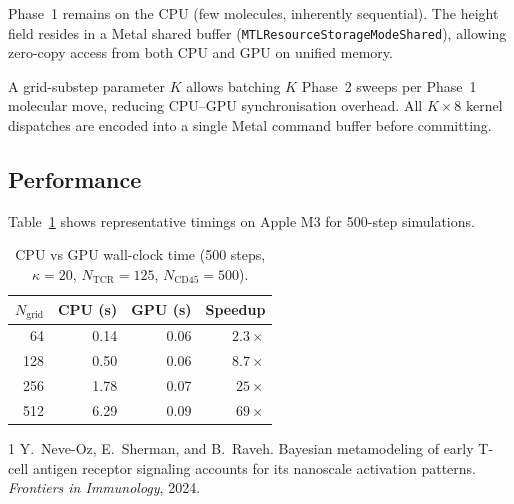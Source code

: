 \documentclass[11pt,a4paper]{article}
\begin{document}
\noindent
Phase~1 remains on the CPU (few molecules, inherently sequential).
The height field resides in a Metal shared buffer
(\texttt{MTLResourceStorageModeShared}), allowing zero-copy access
from both CPU and GPU on unified memory.

A grid-substep parameter $K$ allows batching $K$ Phase~2 sweeps per
Phase~1 molecular move, reducing CPU--GPU synchronisation overhead.
All $K \times 8$ kernel dispatches are encoded into a single Metal
command buffer before committing.

\subsection{Performance}

Table~\ref{tab:perf} shows representative timings on Apple M3 for
500-step simulations.

\begin{table}[ht]
  \centering
  \caption{CPU vs GPU wall-clock time (500 steps, $\kappa=20$,
    $N_\text{TCR}=125$, $N_\text{CD45}=500$).}
  \label{tab:perf}
  \begin{tabular}{@{}rrrr@{}}
    \toprule
    $N_\text{grid}$ & CPU (s) & GPU (s) & Speedup \\
    \midrule
     64  & 0.14  & 0.06  & $2.3\times$ \\
    128  & 0.50  & 0.06  & $8.7\times$ \\
    256  & 1.78  & 0.07  & $25\times$ \\
    512  & 6.29  & 0.09  & $69\times$ \\
    \bottomrule
  \end{tabular}
\end{table}



\begin{thebibliography}{1}
  Y.~Neve-Oz, E.~Sherman, and B.~Raveh.
  \newblock Bayesian metamodeling of early T-cell antigen receptor signaling
    accounts for its nanoscale activation patterns.
  \newblock \textit{Frontiers in Immunology}, 2024.
\end{thebibliography}
\end{document}

